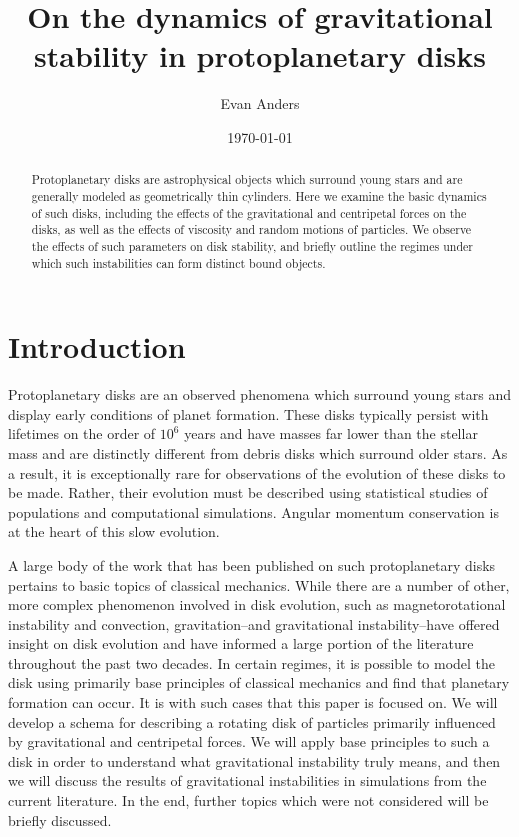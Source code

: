\documentclass[aps,pra,twocolumn]{revtex4-1}
\begin{document}
\title{On the dynamics of gravitational stability in protoplanetary disks}

\author{Evan Anders}


\date{\today}

\begin{abstract}
Protoplanetary disks are astrophysical objects which surround young stars and are generally modeled as geometrically thin cylinders.  Here we examine the basic dynamics of such disks, including the effects of the gravitational and centripetal forces on the disks, as well as the effects of viscosity and random motions of particles.  We observe the effects of such parameters on disk stability, and briefly outline the regimes under which such instabilities can form distinct bound objects.
\end{abstract}



\maketitle


\section{\label{section1} Introduction}

Protoplanetary disks are an observed phenomena which surround young stars and display early conditions of planet formation.  These disks typically persist with lifetimes on the order of $10^6$ years and have masses far lower than the stellar mass and are distinctly different from debris disks which surround older stars.  As a result, it is exceptionally rare for observations of the evolution of these disks to be made.  Rather, their evolution must be described using statistical studies of populations and computational simulations.  Angular momentum conservation is at the heart of this slow evolution.   \cite{armitage2011}

A large body of the work that has been published on such protoplanetary disks pertains to basic topics of classical mechanics.  While there are a number of other, more complex phenomenon involved in disk evolution, such as magnetorotational instability and convection, gravitation--and gravitational instability--have offered insight on disk evolution and have informed a large portion of the literature throughout the past two decades.  In certain regimes, it is possible to model the disk using primarily base principles of classical mechanics and find that planetary formation can occur.  It is with such cases that this paper is focused on.  We will develop a schema for describing a rotating disk of particles primarily influenced by gravitational and centripetal forces.  We will apply base principles to such a disk in order to understand what gravitational instability truly means, and then we will discuss the results of gravitational instabilities in simulations from the current literature.  In the end, further topics which were not considered will be briefly discussed.
\end{document}
